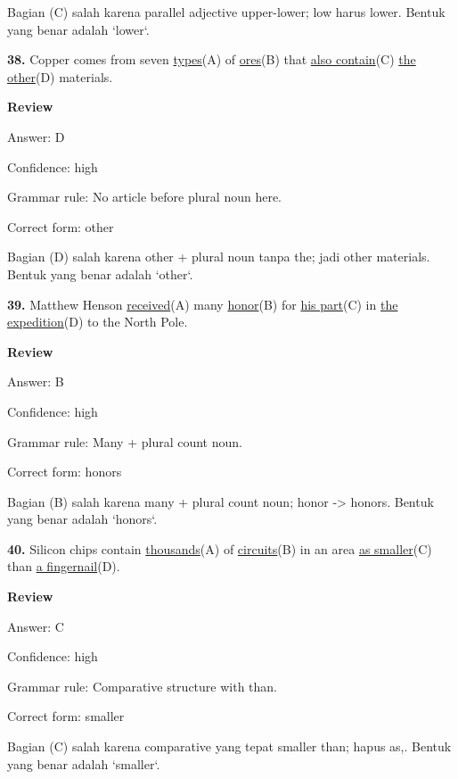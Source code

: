 \documentclass[12pt]{article}
\begin{document}
Bagian (C) salah karena parallel adjective upper-lower; low harus lower. Bentuk yang benar adalah `lower`.\par
\endgroup
\par
\vspace{\questionblockgap}
\noindent\textbf{38.} Copper comes from seven \uline{types}(A) of \uline{ores}(B) that \uline{also contain}(C) \uline{the other}(D) materials.
\par
\begingroup
\setlength{\parskip}{0pt}
\setlength{\parindent}{0pt}
\textbf{Review}\par
Answer: D\par
Confidence: high\par
Grammar rule: No article before plural noun here.\par
Correct form: other\par
Bagian (D) salah karena other + plural noun tanpa the; jadi other materials. Bentuk yang benar adalah `other`.\par
\endgroup
\par
\vspace{\questionblockgap}
\noindent\textbf{39.} Matthew Henson \uline{received}(A) many \uline{honor}(B) for \uline{his part}(C) in \uline{the expedition}(D) to the North Pole.
\par
\begingroup
\setlength{\parskip}{0pt}
\setlength{\parindent}{0pt}
\textbf{Review}\par
Answer: B\par
Confidence: high\par
Grammar rule: Many + plural count noun.\par
Correct form: honors\par
Bagian (B) salah karena many + plural count noun; honor -> honors. Bentuk yang benar adalah `honors`.\par
\endgroup
\par
\vspace{\questionblockgap}
\noindent\textbf{40.} Silicon chips contain \uline{thousands}(A) of \uline{circuits}(B) in an area \uline{as smaller}(C) than \uline{a fingernail}(D).
\par
\begingroup
\setlength{\parskip}{0pt}
\setlength{\parindent}{0pt}
\textbf{Review}\par
Answer: C\par
Confidence: high\par
Grammar rule: Comparative structure with than.\par
Correct form: smaller\par
Bagian (C) salah karena comparative yang tepat smaller than; hapus as,. Bentuk yang benar adalah `smaller`.\par
\endgroup
\par
\vspace{\questionblockgap}
\end{document}
